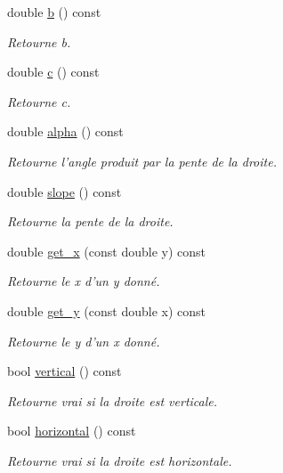 \begin{DoxyCompactItemize}
double \hyperlink{classLine_a3fbf3dbd1b40db13b2624d69ab5cca27}{b} () const 
\begin{DoxyCompactList}\small\item\em Retourne b. \end{DoxyCompactList}\item 
double \hyperlink{classLine_a178f0e9f733556ef03ba94e5aac96005}{c} () const 
\begin{DoxyCompactList}\small\item\em Retourne c. \end{DoxyCompactList}\item 
double \hyperlink{classLine_afe0a0abb45c0adccaedfaded8645600f}{alpha} () const 
\begin{DoxyCompactList}\small\item\em Retourne l'angle produit par la pente de la droite. \end{DoxyCompactList}\item 
double \hyperlink{classLine_a582597e85fc78ba06ccdddf6c270ed71}{slope} () const 
\begin{DoxyCompactList}\small\item\em Retourne la pente de la droite. \end{DoxyCompactList}\item 
double \hyperlink{classLine_a53605544b400dda2164802a374f25b92}{get\+\_\+x} (const double y) const 
\begin{DoxyCompactList}\small\item\em Retourne le x d'un y donné. \end{DoxyCompactList}\item 
double \hyperlink{classLine_abe48fc1d77385ea5a80dc0a314127cff}{get\+\_\+y} (const double x) const 
\begin{DoxyCompactList}\small\item\em Retourne le y d'un x donné. \end{DoxyCompactList}\item 
bool \hyperlink{classLine_a8774606646298fb27a6e158af5e84590}{vertical} () const 
\begin{DoxyCompactList}\small\item\em Retourne vrai si la droite est verticale. \end{DoxyCompactList}\item 
bool \hyperlink{classLine_a1be7d198aeee493e6fba56f09057b4a6}{horizontal} () const 
\begin{DoxyCompactList}\small\item\em Retourne vrai si la droite est horizontale. \end{DoxyCompactList}\item 

\end{DoxyCompactItemize}
